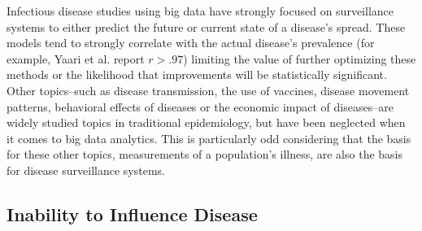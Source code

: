 Infectious disease studies using big data have strongly focused on surveillance systems \cite{world2006communicable} to either predict the future or current state of a disease's spread. \cite{gft,chunara2012new,culotta2010towards,goel2010predicting,signorini2011use,kim2013use} These models tend to strongly correlate with the actual disease's prevalence (for example, Yaari et al. \cite{yaari2013modelling} report \( r > .97\)) limiting the value of further optimizing these methods or the likelihood that improvements will be statistically significant. Other topics--such as disease transmission\cite{salathe2010high,Cauchemez:2011cp,Ferrari:2011ht}, the use of vaccines\cite{Salathe:2011gr,Wells:2013tp,Seale:2010br,Larson:2013kh,Bansal:2006di,Salathe:2008ct}, disease movement patterns\cite{Huang:2013ed,Balcan:2009ub,Afzal:2011bc}, behavioral effects of diseases\cite{Funk:2010cc,Jones:2009cv,Funk:2009ks} or the economic impact of diseases\cite{Tudor:2008kh,GruneYanoff:2011hl,Glasser:2004is}--are widely studied topics in traditional epidemiology, but have been neglected when it comes to big data analytics. This is particularly odd considering that the basis for these other topics, measurements of a population's illness, are also the basis for disease surveillance systems.



\subsection{Inability to Influence Disease}

